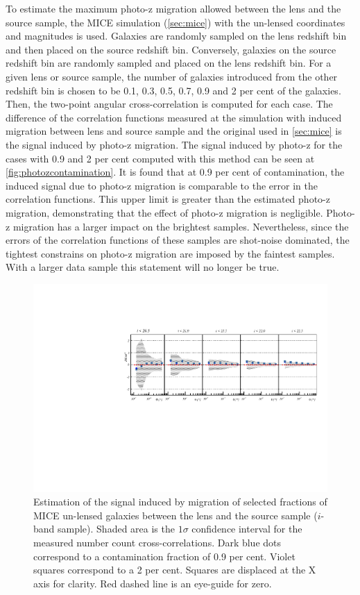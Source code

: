 To estimate the maximum photo-z migration allowed between the lens and the source sample, the MICE simulation (\autoref{sec:mice}) with the un-lensed coordinates and magnitudes is used. Galaxies are randomly sampled on the lens redshift bin and then placed on the source redshift bin. Conversely, galaxies on the source redshift bin are randomly sampled and placed on the lens redshift bin. For a given lens or source sample, the number of galaxies introduced from the other redshift bin is chosen to be 0.1, 0.3, 0.5, 0.7, 0.9 and 2 per cent of the galaxies. Then, the two-point angular cross-correlation is computed for each case. The difference of the correlation functions measured at the simulation with induced migration between lens and source sample and the original used in \autoref{sec:mice} is the signal induced by photo-z migration. The signal induced by photo-z for the cases with 0.9 and 2 per cent computed with this method can be seen at \autoref{fig:photozcontamination}. It is found that  at 0.9 per cent of contamination, the induced signal due to photo-z migration is comparable to the error in the correlation functions. This upper limit is greater than the estimated photo-z migration, demonstrating that the effect of photo-z migration is negligible. Photo-z migration has a larger impact on the brightest samples. Nevertheless, since the errors of the correlation functions of these samples are shot-noise dominated, the tightest constrains on photo-z migration are imposed by the faintest samples. With a larger data sample this statement will no longer be true.
\begin{figure}
\includegraphics[width=\textwidth,trim={0 2.3cm 0 3.5cm},clip]{./figures/mag_i_mix.pdf}
\caption{Estimation of the signal induced by migration of selected fractions of MICE un-lensed galaxies between the lens and the source sample ($i$-band sample). Shaded area is the $1\sigma$ confidence interval for the measured number count cross-correlations. Dark blue dots correspond to a contamination fraction of 0.9 per cent. Violet squares correspond to a 2 per cent. Squares are displaced at the X axis for clarity. Red dashed line is an eye-guide for zero.}
\label{fig:photozcontamination}
\end{figure}
\newline

